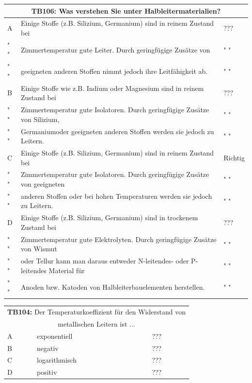 \begin{frame}
	\begin{tiny}
	\begin{tabular}{|l|l|l|}
	\hline
		\multicolumn{3}{|c|}{\textbf{TB106:} Was verstehen Sie unter Halbleitermaterialien?}\\

		\hline
		A & Einige Stoffe (z.B. Silizium, Germanium) sind in reinem Zustand bei  & ??? \\
		" " & Zimmertemperatur gute Leiter. Durch geringfügige Zusätze von  & " "\\
		" " & geeigneten anderen Stoffen nimmt jedoch ihre Leitfähigkeit ab.  & " "\\ \hline
		
		B & Einige Stoffe wie z.B. Indium oder Magnesium sind in reinem Zustand bei   & ??? \\
		" " & Zimmertemperatur gute Isolatoren. Durch geringfügige Zusätze von Silizium, & " "\\
		" " & Germaniumoder geeigneten anderen Stoffen werden sie jedoch zu Leitern.  & " "\\ \hline
		C & Einige Stoffe (z.B. Silizium, Germanium) sind in reinem Zustand bei & Richtig \\
		" " & Zimmertemperatur gute Isolatoren. Durch geringfügige Zusätze von geeigneten & " "\\
		" " &  anderen Stoffen oder bei hohen Temperaturen werden sie jedoch zu Leitern. & " "\\ \hline
		
		D & Einige Stoffe (z.B. Silizium, Germanium) sind in trockenem Zustand bei & ??? \\
		" " & Zimmertemperatur gute Elektrolyten. Durch geringfügige Zusätze von Wismut& " "\\
		" " & oder Tellur kann man daraus entweder N-leitendes- oder P-leitendes Material für& " "\\
		" " &   Anoden bzw. Katoden von Halbleiterbauelementen herstellen. & " " \\ \hline
	\end{tabular}
	\end{tiny}
\end{frame}

\begin{frame}
	\begin{small}	
	\begin{tabular}{|l|l|l|}
	\hline
		\multicolumn{3}{|c|}{\textbf{TB104:} Der Temperaturkoeffizient für den Widerstand von}\\
		\multicolumn{3}{|c|}{ metallischen Leitern ist ...}\\
		\hline
		A & exponentiell & ??? \\ \hline
		B & negativ & ??? \\ \hline
		C & logarithmisch & ??? \\ \hline
		D & positiv & ??? \\ \hline 		
	\end{tabular}
	\end{small}
\end{frame}


